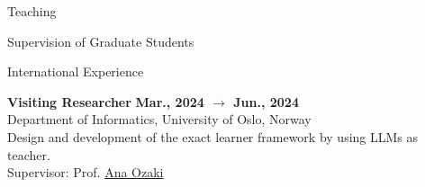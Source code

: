\documentclass{resume} %
\begin{document}
\begin{rSection}{Teaching}
\begin{rSubsection2}{Supervision of Graduate Students}
        \end{rSubsection2}


        \begin{rSubsection2}{International Experience}

            \item\textbf{ Visiting Researcher }\hfill \textbf{Mar., 2024 $\rightarrow$ Jun., 2024}
            \\Department of Informatics, University of Oslo, Norway
            \\Design and development of the exact learner framework by using LLMs as teacher.
            \\Supervisor: Prof. \href{mailto:anaoz@ifi.uio.no}{Ana Ozaki}

        \end{rSubsection2}

    \end{rSection}

    \newpage

\end{document}
